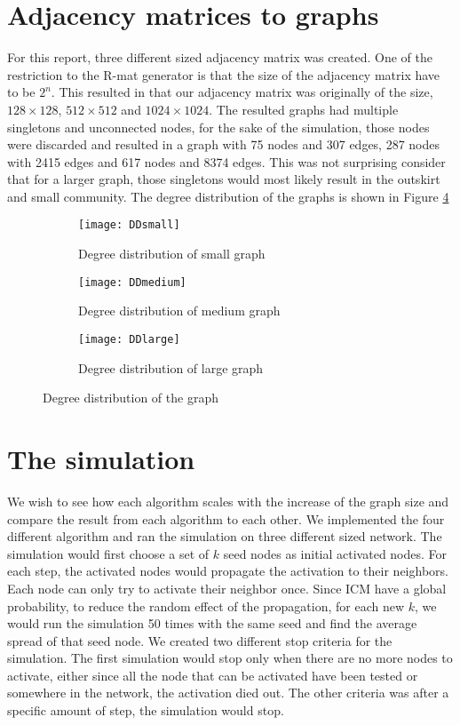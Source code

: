 \section{Adjacency matrices to graphs}
For this report, three different sized adjacency matrix was created. One of the restriction to the R-mat generator is that the size of the adjacency matrix have to be $2^n$. This resulted in that our adjacency matrix was originally of the size, $128 \times 128$, $512 \times 512$ and $1024 \times 1024$. The resulted graphs had multiple singletons and unconnected nodes, for the sake of the simulation, those nodes were discarded and resulted in a graph with 75 nodes and 307 edges, 287 nodes with 2415 edges and 617 nodes and 8374 edges. This was not surprising consider that for a larger graph, those singletons would most likely result in the outskirt and small community. The degree distribution of the graphs is shown in Figure \ref{fig:DD}

\begin{figure}[!ht]
	\begin{subfigure}{0.3\textwidth}
		\texttt{[image: DDsmall]}
		\caption{Degree distribution of small graph} 
		\label{fig:smallDegree}
	\end{subfigure}
	\begin{subfigure}{0.3\textwidth}
		\texttt{[image: DDmedium]}
		\caption{Degree distribution of medium graph} 
		\label{fig:mediumDegree}
	\end{subfigure}
	\begin{subfigure}{0.3\textwidth}
		\texttt{[image: DDlarge]}
		\caption{Degree distribution of large graph} 
		\label{fig:largeDegree}
	\end{subfigure}
	\caption{Degree distribution of the graph}
	\label{fig:DD}
\end{figure}



\section{The simulation}
We wish to see how each algorithm scales with the increase of the graph size and compare the result from each algorithm to each other. We implemented the four different algorithm and ran the simulation on three different sized network. The simulation would first choose a set of $k$ seed nodes as initial activated nodes. For each step, the activated nodes would propagate the activation to their neighbors. Each node can only try to activate their neighbor once. Since ICM have a global probability, to reduce the random effect of the propagation, for each new $k$, we would run the simulation 50 times with the same seed and find the average spread of that seed node. We created two different stop criteria for the simulation. The first simulation would stop only when there are no more nodes to activate, either since all the node that can be activated have been tested or somewhere in the network, the activation died out. The other criteria was after a specific amount of step, the simulation would stop.

